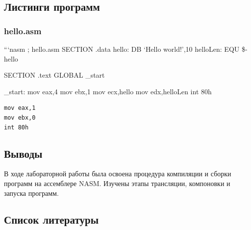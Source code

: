 \documentclass[
  english,
  russian,
  13pt,
  a4paper,
  DIV=11,
  numbers=noendperiod]{scrreprt}
\begin{document}
\subsection{Листинги
программ}\label{ux43bux438ux441ux442ux438ux43dux433ux438-ux43fux440ux43eux433ux440ux430ux43cux43c}

\subsubsection{hello.asm}\label{hello.asm}

```nasm ; hello.asm SECTION .data hello: DB \enquote*{Hello world!},10
helloLen: EQU \$-hello

SECTION .text GLOBAL \_start

\_start: mov eax,4 mov ebx,1 mov ecx,hello mov edx,helloLen int 80h

\begin{verbatim}
mov eax,1
mov ebx,0
int 80h
\end{verbatim}

\subsection{Выводы}\label{ux432ux44bux432ux43eux434ux44b}

В ходе лабораторной работы была освоена процедура компиляции и сборки
программ на ассемблере NASM. Изучены этапы трансляции, компоновки и
запуска программ.

\subsection{Список
литературы}\label{ux441ux43fux438ux441ux43eux43a-ux43bux438ux442ux435ux440ux430ux442ux443ux440ux44b}
\end{document}
